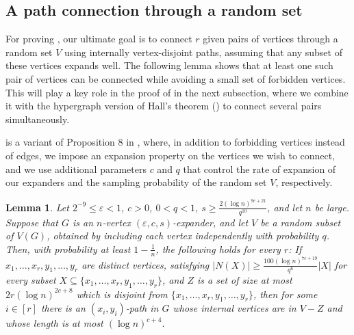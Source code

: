 \documentclass[10pt]{article}
\theoremstyle{plain}
\numberwithin{theorem}{section}
\newtheorem{lemma}[theorem]{Lemma}
\theoremstyle{definition}
\theoremstyle{remark}
\renewcommand{\setminus}{-}
\newcommand{\eps}{\varepsilon}
\theoremstyle{plain}
\begin{document}
	\subsection{A path connection through a random set} \label{subsec:expansion-step-two}

		For proving , our ultimate goal is to connect $r$ given pairs of vertices through a random set $V$ using internally vertex-disjoint paths, assuming that any subset of these vertices expands well. 
        The following lemma shows that at least one such pair of vertices can be connected while avoiding a small set of forbidden vertices. This will play a key role in the proof of  in the next subsection, where we combine it with the hypergraph version of Hall's theorem () to connect several pairs simultaneously.
        
         is a variant of Proposition 8 in \cite{bucic2022erdos}, where, in addition to forbidding vertices instead of edges, we impose an expansion property on the vertices we wish to connect, and we use additional parameters $c$ and $q$ that control the rate of expansion of our expanders and the sampling probability of the random set $V$, respectively. 

		\begin{lemma} \label{lem:hall-condition}
			Let $2^{-9} \le \eps < 1$, $c > 0$, $0 < q < 1$, $s \ge \frac{2 (\log n)^{9c+21}}{q^{10}}$, and let $n$ be large. Suppose that $G$ is an $n$-vertex $(\eps, c, s)$-expander, and let $V$ be a random subset of $V(G)$, obtained by including each vertex independently with probability $q$.
			Then, with probability at least $1 - \frac{1}{n}$, the following holds for every $r$: If $x_1, \ldots, x_r, y_1, \ldots, y_r$ are distinct vertices, satisfying $|N(X)| \ge \frac{100 (\log n)^{7c+19}}{q^6}|X|$ for every subset $X \subseteq \{x_1, \ldots, x_r, y_1, \ldots, y_r\}$, and $Z$ is a set of size at most $2r(\log n)^{2c+8}$ which is disjoint from $\{x_1, \ldots, x_r, y_1, \ldots, y_r\}$, then for some $i \in [r]$ there is an $(x_i, y_i)$-path in $G$ whose internal vertices are in $V \setminus Z$ and whose length is at most $(\log n)^{c+4}$.
		\end{lemma}		
\end{document}
